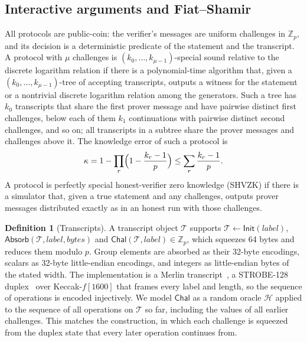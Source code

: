 \documentclass[11pt]{article}
\theoremstyle{definition}
\newtheorem{definition}[lemma]{Definition}
\theoremstyle{remark}
\newcommand{\Z}{\mathbb{Z}}
\newcommand{\RO}{\mathcal{H}}
\newcommand{\tr}{\mathcal{T}}
\begin{document}
\subsection{Interactive arguments and Fiat--Shamir}\label{sec:fs}
All protocols are public-coin: the verifier's messages are uniform challenges in $\Z_p$, and its decision is a deterministic predicate of the statement and the transcript. A protocol with $\mu$ challenges is $(k_0,\ldots,k_{\mu-1})$-special sound relative to the discrete logarithm relation if there is a polynomial-time algorithm that, given a $(k_0,\ldots,k_{\mu-1})$-tree of accepting transcripts, outputs a witness for the statement or a nontrivial discrete logarithm relation among the generators. Such a tree has $k_0$ transcripts that share the first prover message and have pairwise distinct first challenges, below each of them $k_1$ continuations with pairwise distinct second challenges, and so on; all transcripts in a subtree share the prover messages and challenges above it. The knowledge error of such a protocol is
\[
  \kappa=1-\prod_r\Bigl(1-\frac{k_r-1}{p}\Bigr)\le\sum_r\frac{k_r-1}{p}.
\]
A protocol is perfectly special honest-verifier zero knowledge (SHVZK) if there is a simulator that, given a true statement and any challenges, outputs prover messages distributed exactly as in an honest run with those challenges.

\begin{definition}[Transcripts]\label{def:transcript}
A transcript object $\tr$ supports $\tr\gets\mathsf{Init}(\textit{label})$, $\mathsf{Absorb}(\tr,\textit{label},\textit{bytes})$ and $\mathsf{Chal}(\tr,\textit{label})\in\Z_p$, which squeezes 64 bytes and reduces them modulo $p$. Group elements are absorbed as their 32-byte encodings, scalars as 32-byte little-endian encodings, and integers as little-endian bytes of the stated width. The implementation is a Merlin transcript~\cite{merlin}, a STROBE-128 duplex~\cite{strobe} over Keccak-$f[1600]$ that frames every label and length, so the sequence of operations is encoded injectively. We model $\mathsf{Chal}$ as a random oracle $\RO$ applied to the sequence of all operations on $\tr$ so far, including the values of all earlier challenges. This matches the construction, in which each challenge is squeezed from the duplex state that every later operation continues from.
\end{definition}
\end{document}
